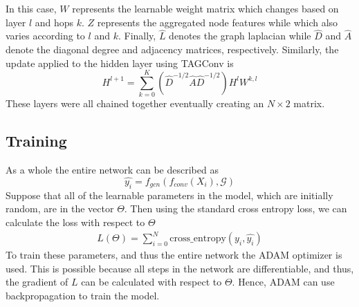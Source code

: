 In this case, $W$ represents the learnable weight matrix which changes based on layer $l$ and hops $k$. $Z$ represents the aggregated node features while which also varies according to $l$ and $k$. Finally, $\hat{L}$ denotes the graph laplacian while $\hat{D}$ and $\hat{A}$ denote the diagonal degree and adjacency matrices, respectively. Similarly, the update applied to the hidden layer using TAGConv is
\[
    H^{l+1} = \sum_{k=0}^K (\hat{D}^{-1/2}\hat{A}\hat{D}^{-1/2})H^lW^{k,l}
\]
These layers were all chained together eventually creating an $N \times 2$ matrix.

\subsection{Training}
As a whole the entire network can be described as
\[
    \hat{y_i} = f_{gcn}(f_{conv}(X_i), \mathcal{G})
\]
Suppose that all of the learnable parameters in the model, which are initially random, are in the vector $\Theta$. Then using the standard cross entropy loss, we can calculate the loss with respect to $\Theta$
\begin{align*}
    L(\Theta) = \sum_{i=0}^N \text{cross\_entropy}(y_i, \hat{y_i})
\end{align*}
To train these parameters, and thus the entire network the ADAM optimizer is used. This is possible because all steps in the network are differentiable, and thus, the gradient of $L$ can be calculated with respect to $\Theta$. Hence, ADAM can use backpropagation to train the model.